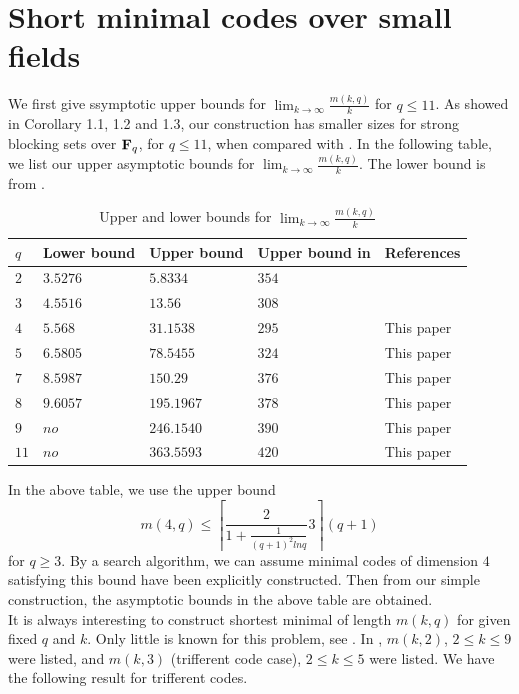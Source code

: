 \documentclass[12pt]{article}
\begin{document}
\section{Short minimal codes over small fields}


We first give ssymptotic upper bounds for $\lim_{k \longrightarrow \infty} \frac{m(k,q)}{k}$ for $ q \leq 11$. As showed in Corollary 1.1, 1.2 and 1.3, our construction has smaller sizes for strong blocking sets over ${\bf F}_q$, for $q \leq 11$, when compared with \cite[Table]{Alon}. In the following table, we list our upper asymptotic bounds for $\lim_{k \longrightarrow \infty} \frac{m(k,q)}{k}$. The lower bound is from \cite[Table 1]{Scotti}.\\

\begin{longtable}{|l|l|l|l|l|}
\caption{\label{tab:6-1} Upper and lower bounds for $\lim_{k \longrightarrow \infty}\frac{m(k,q)}{k}$}\\ \hline
$q$     & Lower bound &Upper bound&Upper bound in \cite{Alon}&References \\ \hline
$2$           & $3.5276$ &$5.8334$&$354$ & \cite{Borello}\\ \hline
$3$       & $4.5516$ &$13.56$&$308$ & \cite{Bishnoi}\\ \hline
$4$    & $5.568$ &$31.1538$&$295$& This paper \\ \hline
$5$ &$6.5805$ &$78.5455$&$324$& This paper\\ \hline
$7$ &$8.5987$&$150.29$ & $376$&This paper\\ \hline
$8$&$9.6057$&$195.1967$ &$378$&This paper\\ \hline
$9$ &$no$& $246.1540$ &$390$&This paper\\ \hline
$11$ &$no$& $363.5593$ &$420$&This paper\\ \hline
\end{longtable}	

In the above table, we use the upper bound $$m(4,q) \leq \left\lceil \frac{2}{1+\frac{1}{(q+1)^2ln q}}3\right\rceil (q+1)$$ for $q \geq 3$. By a search algorithm, we can assume minimal codes of dimension $4$ satisfying this bound have been explicitly constructed. Then from our simple construction, the asymptotic bounds in the above table are obtained.\\


It is always interesting to construct shortest minimal of length $m(k,q)$ for given fixed $q$ and $k$. Only little is known for this problem, see \cite{Kurz,Kurz1,Scotti1}. In \cite[Page 6]{Scotti1}, $m(k,2)$, $2 \leq k \leq 9$ were listed, and $m(k,3)$ (trifferent code case), $2\leq k \leq 5$ were listed.  We have the following result for trifferent codes.\\
\end{document}
